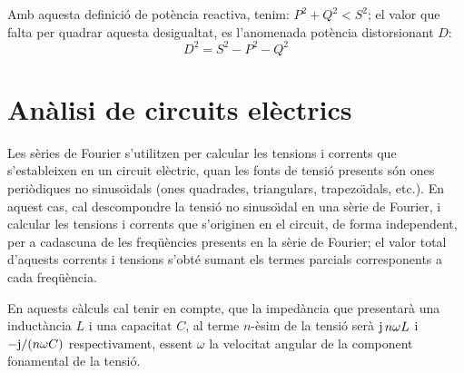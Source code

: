 Amb aquesta definici\'{o} de pot\`{e}ncia reactiva, tenim: $P^2+Q^2 < S^2$;
el valor que falta per quadrar aquesta desigualtat, es l'anomenada
pot\`{e}ncia distorsionant $D$:
\begin{equation}
    D^2 = S^2 - P^2 - Q^2
\end{equation}

\section{An\`{a}lisi de circuits el\`{e}ctrics}

Les s\`{e}ries de Fourier s'utilitzen per calcular les tensions i
corrents que s'estableixen en un circuit el\`{e}ctric, quan les fonts de
tensi\'{o} presents  s\'{o}n ones peri\`{o}diques no sinuso\"{\i}dals (ones
quadrades, triangulars, trapezo\"{\i}dals, etc.). En aquest cas, cal
descompondre la tensi\'{o} no sinuso\"{\i}dal en una s\`{e}rie de Fourier, i
calcular les tensions i corrents que s'originen en el circuit, de
forma independent, per a cadascuna de les freq\"{u}\`{e}ncies presents en la
s\`{e}rie de Fourier; el valor total d'aquests corrents i tensions
s'obt\'{e} sumant els termes parcials corresponents a cada freq\"{u}\`{e}ncia.

En aquests c\`{a}lculs cal tenir en compte, que la imped\`{a}ncia que
presentar\`{a} una induct\`{a}ncia $L$ i una capacitat $C$, al terme
$n$-\`{e}sim de la tensi\'{o} ser\`{a} $\mathrm{j}\,n \omega L$ i $-\mathrm{j}/(n\omega C)$
respectivament, essent $\omega$ la velocitat angular de la component
fonamental de la tensi\'{o}.

